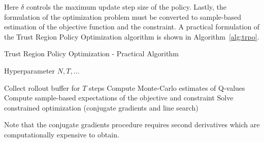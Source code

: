 Here $\delta$ controls the maximum update step size of the policy.
Lastly, the formulation of the optimization problem must be converted to sample-based estimation of the
objective function and the constraint.
A practical formulation of the Trust Region Policy Optimization algorithm is shown in Algorithm~\ref{alg:trpo}.
\begin{algorithm}
\caption{Trust Region Policy Optimization - Practical Algorithm}
    \begin{algorithmic}
        \Require  Hyperparameter $N, T, \dots$

            \State Collect rollout buffer for $T$ steps
            \State Compute Monte-Carlo estimates of Q-values
        \EndFor
        \State Compute sample-based expectations of the objective and constraint
        \State Solve constrained optimization (conjugate gradients and line search)
        \EndWhile
    \end{algorithmic}
    \label{alg:trpo}
\end{algorithm}
Note that the conjugate gradients procedure requires second derivatives which are computationally expensive to obtain.

